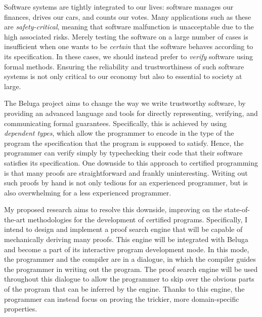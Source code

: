 \documentclass[12pt,letterpaper]{article}
\begin{document}
Software systems are tightly integrated to our lives: software manages our
finances, drives our cars, and counts our votes.
Many applications such as these are \emph{safety-critical},
meaning that software malfunction is unacceptable due to the high associated
risks.
Merely testing the software on a large number of cases is insufficient when one
wants to be \emph{certain} that the software behaves according to its
specification.
In these cases, we should instead prefer to \emph{verify} software using formal
methods. Ensuring the reliability and trustworthiness of such software systems
is not only critical to our economy but also to essential to society at large.

The Beluga project\cite{beluga,inductive-beluga,beluga-2012} aims
to change the way we write trustworthy software, by
providing an advanced language and tools for directly representing, verifying,
and communicating formal guarantees.
Specifically, this is achieved by using \emph{dependent types}, which allow the
programmer to encode in the type of the program the specification that the
program is supposed to satisfy. Hence, the programmer can verify simply by
typechecking their code that their software satisfies its specification.
One downside to this approach to certified programming is that many proofs are
straightforward and frankly uninteresting. Writing out such proofs by hand is
not only tedious for an experienced programmer, but is also overwhelming for a
less experienced programmer.

My proposed research aims to resolve this downside, improving on the
state-of-the-art methodologies for the development of certified programs.
Specifically, I intend to design and implement a proof search engine that will
be capable of mechanically deriving many proofs. This engine will be integrated
with Beluga and become a part of its interactive program development mode. In
this mode, the programmer and the compiler are in a dialogue, in which the
compiler guides the programmer in writing out the program. The proof search
engine will be used throughout this dialogue to allow the programmer to skip
over the obvious parts of the program that can be inferred by the engine.
Thanks to this engine, the programmer can instead focus on proving the
trickier, more domain-specific properties.
\end{document}
